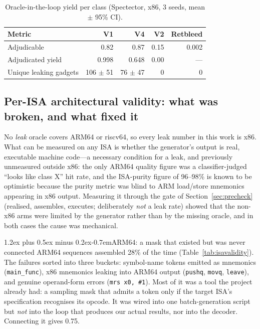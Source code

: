 \documentclass[conference]{IEEEtran}
\makeatletter
\renewcommand\paragraph{\@startsection{paragraph}{4}{\z@}%
  {1.2ex plus 0.5ex minus 0.2ex}{-0.7em}{\normalfont\normalsize\bfseries}}
\makeatother
\begin{document}
\begin{table}[t]
\centering
\caption{Oracle-in-the-loop yield per class (Spectector, x86, 3 seeds, mean $\pm$ 95\% CI).}
\label{tab:rlmc}
\footnotesize
\setlength{\tabcolsep}{3pt}
\begin{tabular}{@{}lrrrr@{}}
\toprule
Metric & V1 & V4 & V2 & Retbleed \\
\midrule
Adjudicable    & 0.82 & 0.87 & 0.15 & 0.002 \\
Adjudicated yield & 0.998 & 0.648 & 0.00 & --- \\
Unique leaking gadgets & 106 $\pm$ 51 & 76 $\pm$ 47 & 0 & 0 \\
\bottomrule
\end{tabular}
\end{table}

\subsection{Per-ISA architectural validity: what was broken, and what fixed it}

\label{sec:otherisa}
No \emph{leak} oracle covers ARM64 or riscv64, so every leak number in this
work is x86. What can be measured on any ISA is whether the generator's output
is real, executable machine code---a necessary condition for a leak, and
previously unmeasured outside x86: the only ARM64 quality figure was a
classifier-judged ``looks like class X'' hit rate, and the ISA-purity figure of
96--98\% is known to be optimistic because the purity metric was blind to ARM
load/store mnemonics appearing in x86 output. Measuring it through the gate of
Section~\ref{sec:precheck} (realised, assembles, executes; deliberately
\emph{not} a leak rate) showed that the non-x86 arms were limited by the
generator rather than by the missing oracle, and in both cases the cause was
mechanical.

\paragraph{ARM64: a mask that existed but was never connected}
ARM64 sequences assembled 28\% of the time (Table~\ref{tab:isavalidity}). The failures sorted into three
buckets: symbol-name tokens emitted as mnemonics (\texttt{main\_func}),
x86 mnemonics leaking into ARM64 output (\texttt{pushq}, \texttt{movq},
\texttt{leave}), and genuine operand-form errors (\texttt{mrs x0, \#1}). Most
of it was a tool the project already had: a sampling mask that admits a token
only if the target ISA's specification recognises its opcode. It was wired into
one batch-generation script but \emph{not} into the loop that produces our
actual results, nor into the decoder. Connecting it gives 0.75.
\end{document}
